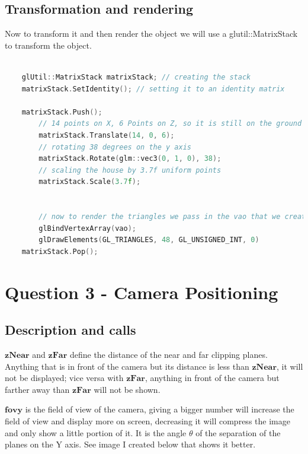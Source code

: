 \documentclass[10pt]{report}
\begin{document}

\section{Transformation and rendering}

Now to transform it and then render the object we will use a glutil::MatrixStack to transform the object.

\begin{lstlisting}[language=c]

    glUtil::MatrixStack matrixStack; // creating the stack
    matrixStack.SetIdentity(); // setting it to an identity matrix

    matrixStack.Push();
        // 14 points on X, 6 Points on Z, so it is still on the ground plane while being on a new positions
        matrixStack.Translate(14, 0, 6);
        // rotating 38 degrees on the y axis
        matrixStack.Rotate(glm::vec3(0, 1, 0), 38);
        // scaling the house by 3.7f uniform points
        matrixStack.Scale(3.7f);


        // now to render the triangles we pass in the vao that we created and the number of triangles * 3 and then draw it on screen.
        glBindVertexArray(vao);
        glDrawElements(GL_TRIANGLES, 48, GL_UNSIGNED_INT, 0)
    matrixStack.Pop();

\end{lstlisting}

\chapter{Question 3 - Camera Positioning}

\section{Description and calls}

\(\textbf{zNear}\) and \(\textbf{zFar}\) define the distance of the near and far clipping planes. Anything that is in front of the camera but its distance is less than \(\textbf{zNear}\), it will not be displayed; vice versa with \(\textbf{zFar}\), anything in front of the camera but farther away than \(\textbf{zFar}\) will not be shown.

\(\textbf{fovy}\) is the field of view of the camera, giving a bigger number will increase the field of view and display more on screen, decreasing it will compress the image and only show a little portion of it. It is the angle $\theta$ of the separation of the planes on the Y axis. See image I created below that shows it better.
\end{document}
